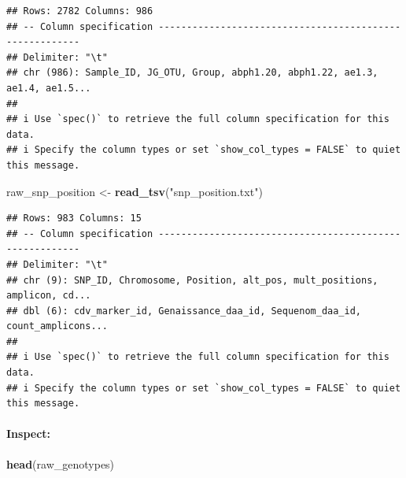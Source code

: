 \documentclass[
]{article}
\newenvironment{Shaded}{\begin{snugshade}}{\end{snugshade}}
\newcommand{\FunctionTok}[1]{\textcolor[rgb]{0.13,0.29,0.53}{\textbf{#1}}}
\newcommand{\NormalTok}[1]{#1}
\newcommand{\OtherTok}[1]{\textcolor[rgb]{0.56,0.35,0.01}{#1}}
\newcommand{\StringTok}[1]{\textcolor[rgb]{0.31,0.60,0.02}{#1}}
\begin{document}
\begin{verbatim}
## Rows: 2782 Columns: 986
## -- Column specification --------------------------------------------------------
## Delimiter: "\t"
## chr (986): Sample_ID, JG_OTU, Group, abph1.20, abph1.22, ae1.3, ae1.4, ae1.5...
## 
## i Use `spec()` to retrieve the full column specification for this data.
## i Specify the column types or set `show_col_types = FALSE` to quiet this message.
\end{verbatim}

\begin{Shaded}
\begin{Highlighting}[]
\NormalTok{raw\_snp\_position }\OtherTok{\textless{}{-}} \FunctionTok{read\_tsv}\NormalTok{(}\StringTok{"snp\_position.txt"}\NormalTok{)}
\end{Highlighting}
\end{Shaded}

\begin{verbatim}
## Rows: 983 Columns: 15
## -- Column specification --------------------------------------------------------
## Delimiter: "\t"
## chr (9): SNP_ID, Chromosome, Position, alt_pos, mult_positions, amplicon, cd...
## dbl (6): cdv_marker_id, Genaissance_daa_id, Sequenom_daa_id, count_amplicons...
## 
## i Use `spec()` to retrieve the full column specification for this data.
## i Specify the column types or set `show_col_types = FALSE` to quiet this message.
\end{verbatim}

\paragraph{Inspect:}\label{inspect}

\begin{Shaded}
\begin{Highlighting}[]
\FunctionTok{head}\NormalTok{(raw\_genotypes)}
\end{Highlighting}
\end{Shaded}
\end{document}
